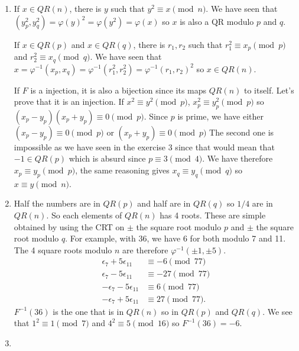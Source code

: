 \begin{solution}
  \begin{enumerate}
    \item
      If $x \in QR(n)$, there is $y$ such that $y^2 \equiv x \pmod{n}$.
      We have seen that $(y_p^2,y_q^2) = \varphi(y)^2 = \varphi(y^2) = \varphi(x)$
      so $x$ is also a QR modulo $p$ and $q$.

      If $x \in QR(p)$ and $x \in QR(q)$, there is $r_1,r_2$ such that
      $r_1^2 \equiv x_p \pmod{p}$ and $r_2^2 \equiv x_q \pmod{q}$.
      We have seen that
      $x = \varphi^{-1}(x_p,x_q) = \varphi^{-1}(r_1^2,r_2^2) = \varphi^{-1}(r_1,r_2)^2$
      so $x \in QR(n)$.

      If $F$ is a injection, it is also a bijection since its maps $QR(n)$ to itself.
      Let's prove that it is an injection.
      If $x^2 \equiv y^2 \pmod{p}$, $x_p^2 \equiv y_p^2 \pmod{p}$ so
      $(x_p-y_p)(x_p+y_p) \equiv 0 \pmod{p}$.
      Since $p$ is prime, we have either
      $(x_p-y_p) \equiv 0 \pmod{p}$
      or
      $(x_p+y_p) \equiv 0 \pmod{p}$
      The second one is impossible as we have seen in the exercise 3 since that would mean that $-1 \in QR(p)$
      which is absurd since $p \equiv 3 \pmod{4}$.
      We have therefore $x_p \equiv y_p \pmod{p}$,
      the same reasoning gives $x_q \equiv y_q \pmod{q}$ so $x \equiv y \pmod{n}$.
    \item
      Half the numbers are in $QR(p)$ and half are in $QR(q)$ so $1/4$ are in $QR(n)$.
      So each elements of $QR(n)$ has 4 roots.
      These are simple obtained by using the CRT on $\pm$ the square root modulo $p$
      and $\pm$ the square root modulo $q$.
      For example, with 36, we have $6$ for both modulo 7 and 11.
      The 4 square roots modulo $n$ are therefore $\varphi^{-1}(\pm 1, \pm 5)$.
      \begin{align*}
        \epsilon_7 + 5\epsilon_{11} & \equiv -6 \pmod{77}\\
        \epsilon_7 - 5\epsilon_{11} & \equiv -27 \pmod{77}\\
        -\epsilon_7 - 5\epsilon_{11} & \equiv 6 \pmod{77}\\
        -\epsilon_7 + 5\epsilon_{11} & \equiv 27 \pmod{77}.
      \end{align*}
      $F^{-1}(36)$ is the one that is in $QR(n)$ so in $QR(p)$ and $QR(q)$.
      We see that $1^2 \equiv 1 \pmod{7}$ and $4^2 \equiv 5 \pmod{16}$ so $F^{-1}(36) = -6$.
    \item
      \begin{enumerate}

\end{enumerate}
\end{enumerate}
\end{solution}
